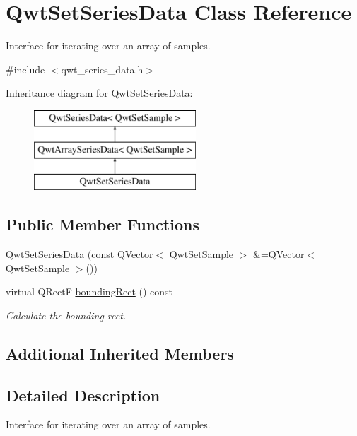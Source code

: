 \hypertarget{class_qwt_set_series_data}{\section{Qwt\-Set\-Series\-Data Class Reference}
\label{class_qwt_set_series_data}
}


Interface for iterating over an array of samples.  




{\ttfamily \#include $<$qwt\-\_\-series\-\_\-data.\-h$>$}

Inheritance diagram for Qwt\-Set\-Series\-Data\-:\begin{figure}[H]
\begin{center}
\leavevmode
\includegraphics[height=3.000000cm]{class_qwt_set_series_data}
\end{center}
\end{figure}
\subsection*{Public Member Functions}
\begin{DoxyCompactItemize}
\item 
\hyperlink{class_qwt_set_series_data_ae28991355a06876fcd14d760771e431b}{Qwt\-Set\-Series\-Data} (const Q\-Vector$<$ \hyperlink{class_qwt_set_sample}{Qwt\-Set\-Sample} $>$ \&=Q\-Vector$<$ \hyperlink{class_qwt_set_sample}{Qwt\-Set\-Sample} $>$())
\item 
virtual Q\-Rect\-F \hyperlink{class_qwt_set_series_data_a63aef8f3405883ab886b06cd27aabe7c}{bounding\-Rect} () const 
\begin{DoxyCompactList}\small\item\em Calculate the bounding rect. \end{DoxyCompactList}\end{DoxyCompactItemize}
\subsection*{Additional Inherited Members}


\subsection{Detailed Description}
Interface for iterating over an array of samples. 

